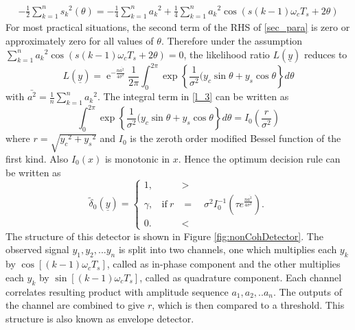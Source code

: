 \documentclass[12pt]{report}
\begin{document}
	\begin{equation}
	\label{sec_para}
	\begin{aligned}
	- \frac{1}{2} \sum_{k=1} ^n {s_k}^2 (\theta) = - \frac{1}{4} \sum_{k=1} ^n {a_k}^2 + \frac{1}{4} \sum_{k=1} ^n {a_k}^2 \cos(s(k - 1)\omega_c T_s + 2\theta)
	\end{aligned}
	\end{equation} 
	For most practical situations, the second term of the RHS of \eqref{sec_para} is zero or approximately zero for all values of $\theta$. 
	Therefore under the assumption $\sum_{k=1} ^n {a_k}^2 \cos(s(k - 1)\omega_c T_s + 2\theta) = 0$, the likelihood ratio $L(\underline{y})$ reduces to 
	\begin{equation}
	\label{l_3}
	L(\underline{y}) = \operatorname{e}^{- \frac{n \overline{a^2}}{4 \sigma^2}} \frac{1}{2\pi} \int_0 ^{2\pi} \exp \left \{ \frac{1}{\sigma^2} (y_c \sin\theta + y_s \cos \theta \right \} d\theta
	\end{equation}
	with $\bar{a^2} = \frac{1}{n} \sum_{k=1} ^n {a_k}^2$. The integral term in \eqref{l_3} can be written as
	\begin{equation}
	\label{bessel}
	\int_0 ^{2\pi} \exp \left \{ \frac{1}{\sigma^2} (y_c \sin\theta + y_s \cos \theta \right \} d\theta = I_0 \left( \frac{r}{\sigma^2} \right)
	\end{equation}
	where $r = \sqrt{{y_c}^2 + {y_s}^2}$ and $I_0$ is the zeroth order modified Bessel function of the first kind. Also $I_0(x)$ is monotonic in $x$. Hence the optimum decision rule can be written as
	\begin{equation}
	\tilde{\delta}_0 (\underline{y}) =  
	\begin{cases}
	1, &>  \\
	\gamma,  \ \ \ \  \mbox{if}~r&= \quad\sigma^2I_0^{-1} \left(\tau e^{\frac{n\overline{a^2}}{4\sigma^2}}\right). \\
	0. &<
	\end{cases}
	\end{equation}
	The structure of this detector is shown in Figure \ref{fig:nonCohDetector}. The observed signal $y_1,y_2,...y_n$ is split into two channels, one which multiplies each $y_k$ by 
	$\cos[(k - 1)\omega_c T_s]$, called as in-phase component and the other multiplies each $y_k$ by $\sin[(k - 1)\omega_c T_s]$, called as quadrature component. 
	Each channel correlates resulting product with amplitude sequence $a_1,a_2,..a_n$. The outputs of the channel are combined to give $r$, which is then compared to a threshold. 
	This structure is also known as envelope detector.
\end{document}
